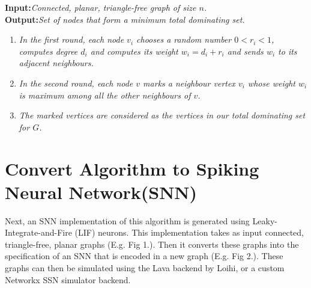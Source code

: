 {%
\textbf{Input:}\textit{Connected, planar, triangle-free graph of size $n$.}\\
\textbf{Output:}\textit{Set of nodes that form a minimum total dominating set.}\\
\vspace{-1.5em}
\begin{enumerate}[noitemsep]
\itemsep-1.5em
\item \textit{In the first round, each node $v_i$ chooses a random number $0<r_i<1$, computes degree $d_i$ and computes its weight $w_i=d_i+r_i$ and sends $w_i$ to its adjacent neighbours.}\\
\item \textit{In the second round, each node $v$ marks a neighbour vertex $v_i$ whose weight $w_i$ is maximum among all the other neighbours of $v$.}\\
\vspace{1.5em}
\item \textit{The marked vertices are considered as the vertices in our total dominating set for $G$.}
\end{enumerate}

\section{Convert Algorithm to Spiking Neural Network(SNN)}\label{subsec:algo_to_snn}
Next, an SNN implementation of this algorithm is generated using Leaky-Integrate-and-Fire (LIF) neurons. This implementation takes as input connected, triangle-free, planar graphs (E.g. Fig 1.). Then it converts these graphs into the specification of an SNN that is encoded in a new graph (E.g. Fig 2.). These graphs can then be simulated using the Lava backend by Loihi, or a custom Networkx SSN simulator backend.

}
